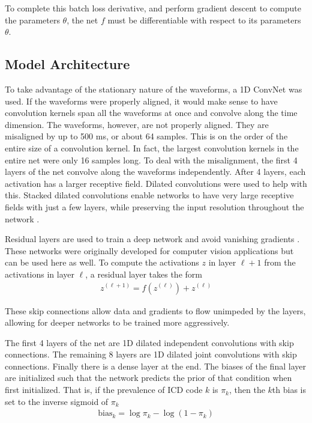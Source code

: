 

To complete this batch loss derivative, and perform gradient descent to compute the parameters $\theta$, the net $f$ must be differentiable with respect to its parameters $\theta$.

\subsection{Model Architecture}

To take advantage of the stationary nature of the waveforms, a 1D ConvNet was used.  If the waveforms were properly aligned, it would make sense to have convolution kernels span all the waveforms at once and convolve along the time dimension.  The waveforms, however, are not properly aligned.  They are misaligned by up to 500 ms, or about 64 samples.  This is on the order of the entire size of a convolution kernel.  In fact, the largest convolution kernels in the entire net were only 16 samples long.  To deal with the misalignment, the first 4 layers of the net convolve along the waveforms independently.  After 4 layers, each activation has a larger receptive field.  Dilated convolutions were used to help with this.  Stacked dilated convolutions enable networks to have very large receptive fields with just a few layers, while preserving the input resolution throughout the network \cite{oord2016wavenet}.  

Residual layers are used to train a deep network and avoid vanishing gradients \cite{he2016deep}.  These networks were originally developed for computer vision applications but can be used here as well.  To compute the activations $z$ in layer $\ell + 1$ from the activations in layer $\ell$, a residual layer takes the form
\begin{gather}
    z^{(\ell + 1)} = f(z^{(\ell)}) + z^{(\ell)}
\end{gather}

These skip connections allow data and gradients to flow unimpeded by the layers, allowing for deeper networks to be trained more aggressively.

The first 4 layers of the net are 1D dilated independent convolutions with skip connections.  The remaining 8 layers are 1D dilated joint convolutions with skip connections.  Finally there is a dense layer at the end.  The biases of the final layer are initialized such that the network predicts the prior of that condition when first initialized.  That is, if the prevalence of ICD code $k$ is $\pi_k$, then the $k$th bias is set to the inverse sigmoid of $\pi_k$
\begin{gather}
    \text{bias}_k = \log \pi_k - \log(1 - \pi_k)
\end{gather}

